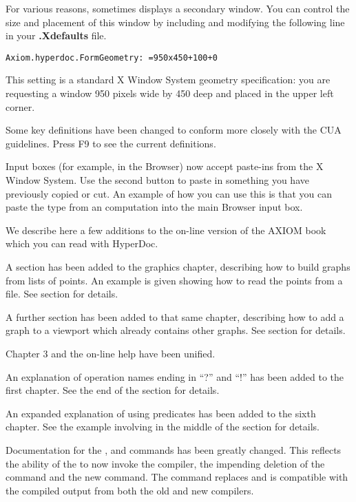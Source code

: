 For various reasons, \HyperName{} sometimes displays a
secondary window. You can control the size and placement of this
window by including and modifying
the following line in your {\bf .Xdefaults} file.
%
\begin{verbatim}
Axiom.hyperdoc.FormGeometry: =950x450+100+0
\end{verbatim}
%
This setting is a standard X Window System geometry specification:
you are requesting a window 950 pixels wide by 450 deep and placed in
the upper left corner.

Some key definitions have been changed to conform more closely
with the CUA guidelines. Press
F9
to see the current definitions.

Input boxes (for example, in the Browser) now accept paste-ins from
the X Window System. Use the second button to paste in something
you have previously copied or cut. An example of how you can use this
is that you can paste the type from an \Language{} computation
into the main Browser input box.


We describe here a few additions to the on-line
version of the AXIOM book which you can read with
HyperDoc.

A section has been added to the graphics chapter, describing
how to build \twodim{} graphs from lists of points. An example is
given showing how to read the points from a file.
See section 
for details.

A further section has been added to that same chapter, describing
how to add a \twodim{} graph to a viewport which already
contains other graphs.
See section
for details.

Chapter 3
and the on-line \HyperName{} help have been unified.

An explanation of operation names ending in ``?'' and ``!'' has
been added to the first chapter.
See the
end of the section
for details.

An expanded explanation of using predicates has
been added to the sixth chapter. See the
example involving  in the middle of the section
for details.

Documentation for the ,  and
 commands has been greatly changed. This reflects
the ability of the  to now invoke the \aldor{}
compiler, the impending deletion of the  command
and the new  command.
The  command replaces  and is
compatible with the compiled output from both the old and new
compilers.

